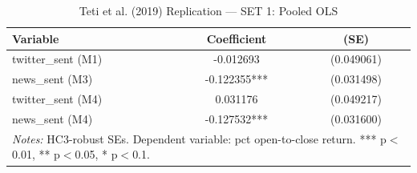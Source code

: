 \begin{table}[htbp]
\centering
\caption{Teti et al. (2019) Replication --- SET 1: Pooled OLS}
\label{tab:teti_set1}
\begin{tabular}{lcc}
\hline\hline
Variable & Coefficient & (SE) \\
\hline
twitter\_sent (M1) & -0.012693 & (0.049061) \\
news\_sent (M3) & -0.122355*** & (0.031498) \\
twitter\_sent (M4) & 0.031176 & (0.049217) \\
news\_sent (M4) & -0.127532*** & (0.031600) \\
\hline\hline
\multicolumn{3}{l}{\footnotesize \textit{Notes:} HC3-robust SEs. Dependent variable: pct open-to-close return. *** p$<$0.01, ** p$<$0.05, * p$<$0.1.} \\
\end{tabular}
\end{table}